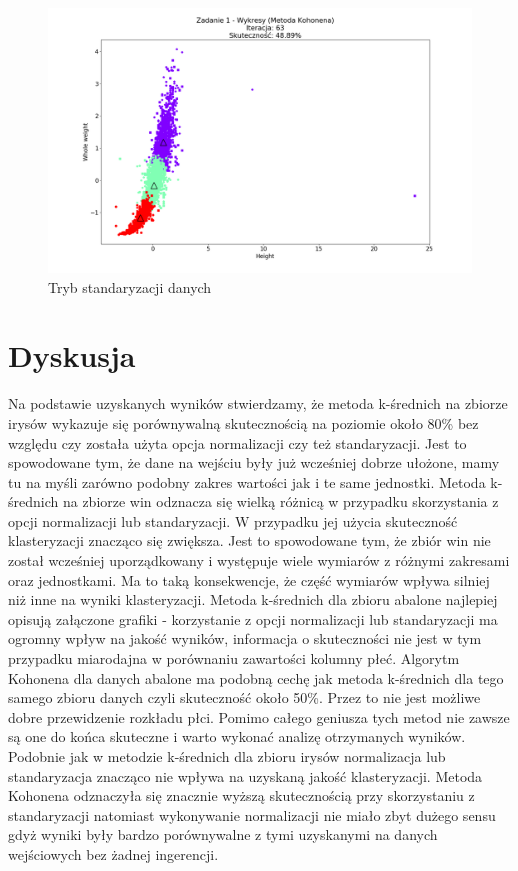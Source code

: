 \documentclass{classrep}
\begin{document}
{{{				\begin{figure}[!htbp]
					\centering
					\includegraphics[width=\textwidth,width=90mm]{wykresy/plot_kohonenAbaloneStandardised.png}
					\caption{Tryb standaryzacji danych}
				\end{figure}
			\FloatBarrier
		}

}

\section{Dyskusja}
{
	Na podstawie uzyskanych wyników stwierdzamy, że metoda k-średnich na zbiorze irysów wykazuje się porównywalną skutecznością na poziomie około 80\% bez względu czy została użyta opcja normalizacji czy też standaryzacji. Jest to spowodowane tym, że dane na wejściu były już wcześniej dobrze ułożone, mamy tu na myśli zarówno podobny zakres wartości jak i te same jednostki. Metoda k-średnich na zbiorze win odznacza się wielką różnicą w przypadku skorzystania z opcji normalizacji lub standaryzacji. W przypadku jej użycia skuteczność klasteryzacji znacząco się zwiększa. Jest to spowodowane tym, że zbiór win nie został wcześniej uporządkowany i występuje wiele wymiarów z różnymi zakresami oraz jednostkami. Ma to taką konsekwencje, że część wymiarów wpływa silniej niż inne na wyniki klasteryzacji. Metoda k-średnich dla zbioru abalone najlepiej opisują załączone grafiki - korzystanie z opcji normalizacji lub standaryzacji ma ogromny wpływ na jakość wyników, informacja o skuteczności nie jest w tym przypadku miarodajna w porównaniu zawartości kolumny płeć. Algorytm Kohonena dla danych abalone ma podobną cechę jak metoda k-średnich dla tego samego zbioru danych czyli skuteczność około 50\%. Przez to nie jest możliwe dobre przewidzenie rozkładu płci. Pomimo całego geniusza tych metod nie zawsze są one do końca skuteczne i warto wykonać analizę otrzymanych wyników. Podobnie jak w metodzie k-średnich dla zbioru irysów normalizacja lub standaryzacja znacząco nie wpływa na uzyskaną jakość klasteryzacji. Metoda Kohonena odznaczyła się znacznie wyższą skutecznością przy skorzystaniu z standaryzacji natomiast wykonywanie normalizacji nie miało zbyt dużego sensu gdyż wyniki były bardzo porównywalne z tymi uzyskanymi na danych wejściowych bez żadnej ingerencji.

}}
\end{document}

